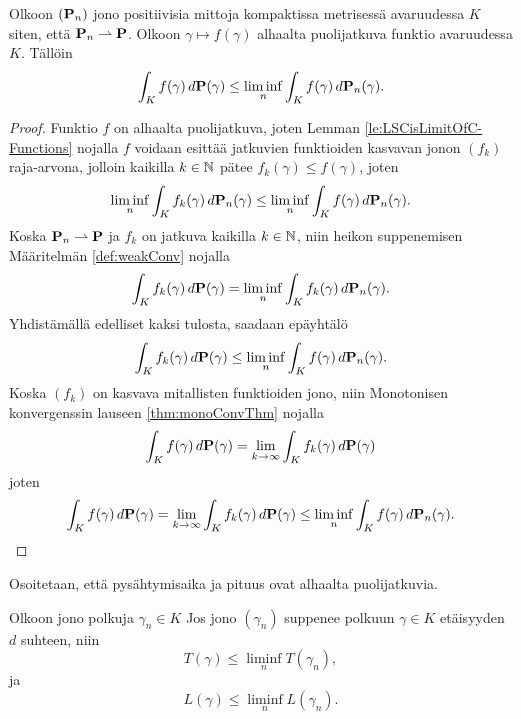 \documentclass[12pt,oneside,a4paper]{amsbook} %
\begin{document}
\begin{lemma}\label{le:fdPLeLiminf}
    Olkoon $(\P_n)$ jono positiivisia mittoja kompaktissa metrisessä avaruudessa $K$ siten, että $\P_n \rightharpoonup \P$. Olkoon $\gamma \mapsto f(\gamma)$ alhaalta puolijatkuva funktio avaruudessa $K$. Tällöin
    \begin{equation*}
        \int_K f(\gamma) \, d\P(\gamma) \le \liminf_n \int_K f(\gamma) \, d\P_n(\gamma).
    \end{equation*}
\end{lemma}
\begin{proof}
    Funktio $f$ on alhaalta puolijatkuva, joten Lemman \ref{le:LSCisLimitOfC-Functions} nojalla $f$ voidaan esittää jatkuvien funktioiden kasvavan jonon $(f_k)$ raja-arvona, jolloin kaikilla $k \in \N$ pätee $f_k(\gamma) \le f(\gamma)$, joten
    \begin{equation*}
        \liminf_n \int_K f_k(\gamma) \, d\P_n(\gamma) \le \liminf_n \int_K f(\gamma)\, d\P_n(\gamma).
    \end{equation*}
    Koska $\P_n \rightharpoonup \P$ ja $f_k$ on jatkuva kaikilla $k \in \N$, niin heikon suppenemisen Määritelmän \ref{def:weakConv} nojalla
    \begin{equation*}
        \int_K f_k(\gamma) \, d\P(\gamma) = \liminf_{n} \int_K f_k(\gamma)\, d\P_n(\gamma).
    \end{equation*}
    Yhdistämällä edelliset kaksi tulosta, saadaan epäyhtälö
    \begin{equation*}\label{eq:mainThmMonoConv}
        \int_K f_k(\gamma) \, d\P(\gamma) \le \liminf_n \int_K f(\gamma) \, d\P_n(\gamma).
    \end{equation*}
    Koska $(f_k)$ on kasvava mitallisten funktioiden jono, niin Monotonisen konvergenssin lauseen \ref{thm:monoConvThm} nojalla 
    \begin{equation*}
        \int_K f(\gamma) \, d\P(\gamma) = \lim_{k\to \infty}\int_K f_k(\gamma)\, d\P(\gamma) 
    \end{equation*}
    joten
    \begin{equation*}
        \int_K f(\gamma) \, d\P(\gamma) = \lim_{k\to \infty}\int_K f_k(\gamma)\, d\P(\gamma)  \le \liminf_n \int_K f(\gamma) \, d\P_n(\gamma).
    \end{equation*}
\end{proof}
Osoitetaan, että pysähtymisaika ja pituus ovat alhaalta puolijatkuvia.
\begin{lemma}\label{le:pysahtymisajan&pituudenLSC}
    Olkoon jono polkuja $\gamma_n \in K$ Jos jono $(\gamma_n)$ suppenee polkuun $\gamma \in K$ etäisyyden $d$ suhteen, niin
    \begin{equation*}
        T(\gamma) \le \liminf_n T(\gamma_n),
    \end{equation*}
    ja 
    \begin{equation*}
        L(\gamma) \le \liminf_n L(\gamma_n).
    \end{equation*}
\end{lemma}
\end{document}
